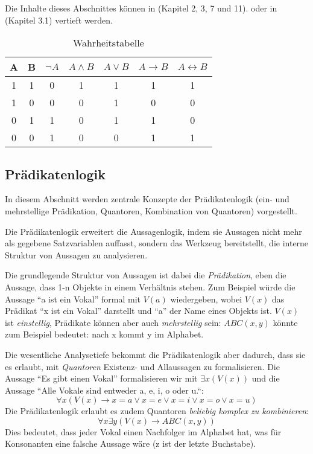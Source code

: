 Die Inhalte dieses Abschnittes können in \cite{link} (Kapitel 2, 3, 7 und 11).
oder in \cite{hoffmann} (Kapitel 3.1)
vertieft werden.

\begin{table}[ht]
    \caption{Wahrheitstabelle}
    \centering
    \begin{tabular}{|c|c|c|c|c|c|c|}
    \hline
          A
        & B
        & $\neg A$
        & $A \wedge B$
        & $A \vee B$
        & $A \rightarrow B$
        & $A \leftrightarrow B$
        \\
        \hline
          1
        & 1
        & 0
        & 1
        & 1
        & 1
        & 1
        \\
        \hline
          1
        & 0
        & 0
        & 0
        & 1
        & 0
        & 0
        \\
        \hline
          0
        & 1
        & 1
        & 0
        & 1
        & 1
        & 0
        \\
        \hline
          0
        & 0
        & 1
        & 0
        & 0
        & 1
        & 1
        \\

    \hline
    \end{tabular}
    \label{tab:al}
\end{table}


\subsection{Prädikatenlogik}\label{pl}

In diesem Abschnitt werden zentrale Konzepte der Prädikatenlogik
(ein- und mehrstellige Prädikation, Quantoren, Kombination von Quantoren)
vorgestellt.

Die Prädikatenlogik erweitert die Aussagenlogik,
indem sie Aussagen nicht mehr als gegebene Satzvariablen auffasst,
sondern das Werkzeug bereitstellt,
die interne Struktur von Aussagen zu analysieren.

Die grundlegende Struktur von Aussagen ist dabei die \emph{Prädikation},
eben die Aussage, dass 1-n Objekte in einem Verhältnis stehen.
Zum Beispiel würde die Aussage
``a ist ein Vokal'' formal mit $V(a)$ wiedergeben,
wobei $V(x)$ das Prädikat ``x ist ein Vokal'' darstellt
und ``a'' der Name eines Objekts ist.
$V(x)$ ist \emph{einstellig},
Prädikate können aber auch \emph{mehrstellig} sein:
$ABC(x,y)$ könnte zum Beispiel bedeutet: nach x kommt y im Alphabet.

Die wesentliche Analysetiefe bekommt die Prädikatenlogik aber dadurch,
dass sie es erlaubt, mit \emph{Quantoren} Existenz- und Allaussagen zu formalisieren.
Die Aussage ``Es gibt einen Vokal'' formalisieren wir mit $\exists x(V(x))$
und die Aussage ``Alle Vokale sind entweder a, e, i, o oder u.``:
\[\forall x (V(x) \rightarrow x = a \vee x = e \vee x = i \vee x = o \vee x = u)\]
Die Prädikatenlogik erlaubt es zudem Quantoren \emph{beliebig komplex zu kombinieren}:
\[\forall x \exists y(V(x) \rightarrow ABC(x,y))\]
Dies bedeutet, dass jeder Vokal einen Nachfolger im Alphabet hat,
was für Konsonanten eine falsche Aussage wäre (z ist der letzte Buchstabe).

